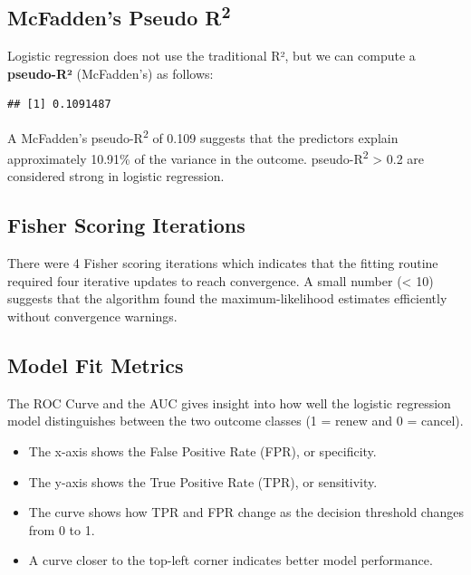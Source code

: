 \documentclass[
]{article}
\newenvironment{Shaded}{\begin{snugshade}}{\end{snugshade}}
\newcommand{\DecValTok}[1]{\textcolor[rgb]{0.00,0.00,0.81}{#1}}
\newcommand{\FunctionTok}[1]{\textcolor[rgb]{0.13,0.29,0.53}{\textbf{#1}}}
\newcommand{\NormalTok}[1]{#1}
\newcommand{\OtherTok}[1]{\textcolor[rgb]{0.56,0.35,0.01}{#1}}
\newcommand{\SpecialCharTok}[1]{\textcolor[rgb]{0.81,0.36,0.00}{\textbf{#1}}}
\begin{document}
\subsection{\texorpdfstring{McFadden's Pseudo
R\textsuperscript{2}}{McFadden's Pseudo R2}}\label{mcfaddens-pseudo-r2}

Logistic regression does not use the traditional R², but we can compute
a \textbf{pseudo-R²} (McFadden's) as follows:

\begin{Shaded}
\end{Shaded}

\begin{verbatim}
## [1] 0.1091487
\end{verbatim}

A McFadden's pseudo-R\textsuperscript{2} of 0.109 suggests that the
predictors explain approximately 10.91\% of the variance in the outcome.
pseudo-R\textsuperscript{2} \textgreater{} 0.2 are considered strong in
logistic regression.

\subsection{Fisher Scoring Iterations}\label{fisher-scoring-iterations}

There were 4 Fisher scoring iterations which indicates that the fitting
routine required four iterative updates to reach convergence. A small
number (\textless{} 10) suggests that the algorithm found the
maximum-likelihood estimates efficiently without convergence warnings.

\subsection{Model Fit Metrics}\label{model-fit-metrics}

The ROC Curve and the AUC gives insight into how well the logistic
regression model distinguishes between the two outcome classes (1 =
renew and 0 = cancel).

\begin{itemize}
\item
  The x-axis shows the False Positive Rate (FPR), or specificity.
\item
  The y-axis shows the True Positive Rate (TPR), or sensitivity.
\item
  The curve shows how TPR and FPR change as the decision threshold
  changes from 0 to 1.
\item
  A curve closer to the top-left corner indicates better model
  performance.
\end{itemize}
\end{document}
